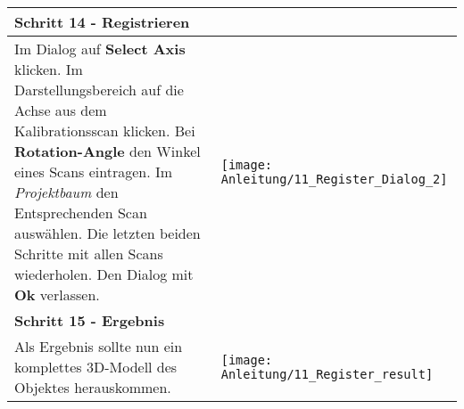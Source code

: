 \begin{longtable}{|>{\RaggedRight}m{5cm}|m{8cm}|}
\multicolumn{2}{|l|}%
{{\textbf{Schritt 14 - Registrieren}}}
\\ \hline
Im Dialog auf \textbf{Select Axis} klicken.\linebreak
Im Darstellungsbereich auf die Achse aus dem Kalibrationsscan klicken.
Bei \textbf{Rotation-Angle} den Winkel eines Scans eintragen.\linebreak
Im \emph{Projektbaum} den Entsprechenden Scan auswählen.\linebreak
Die letzten beiden Schritte mit allen Scans wiederholen.\linebreak
Den Dialog mit \textbf{Ok} verlassen.
& 
\texttt{[image: Anleitung/11\_Register\_Dialog\_2]}
\\ \hline  

\pagebreak 
 

\multicolumn{2}{|l|}%
{{\textbf{Schritt 15 - Ergebnis}}}
\\ \hline
Als Ergebnis sollte nun ein komplettes 3D-Modell des Objektes herauskommen.
& 
\texttt{[image: Anleitung/11\_Register\_result]}
\\ \hline  




\end{longtable} 

